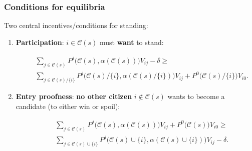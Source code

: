 \documentclass[11pt,aspectratio=169]{beamer}
\begin{document}
\begin{frame}
\frametitle{Conditions for equilibria}





Two central incentives/conditions for standing:

\pause 


\begin{enumerate}
\item \textbf{Participation}: $i \in \mathcal{C}(s)$ must \textbf{want} to stand: \begin{footnotesize}\begin{eqnarray*}
&& \sum_{j \in \mathcal{C}(s)} P^j\bigg(\mathcal{C}(s), \alpha(\mathcal{C}(s))\bigg)V_{ij} -\delta \geq \\ 
&& \sum_{j \in \mathcal{C}(s)/\{i\}} P^j\bigg(\mathcal{C}(s)/\{i\}, \alpha(\mathcal{C}(s)/\{i\})\bigg)V_{ij} + P^0\bigg(\mathcal{C}(s)/\{i\}\bigg)V_{i0}.
\end{eqnarray*} \end{footnotesize}

\pause 
\item \textbf{Entry proofness}: \textbf{no other citizen} $i\not\in\mathcal{C}(s)$ wants to become a candidate (to either win or spoil): \begin{footnotesize}\begin{eqnarray*}
&& \sum_{j \in \mathcal{C}(s)} P^j\bigg(\mathcal{C}(s), \alpha(\mathcal{C}(s))\bigg)V_{ij} + P^0\bigg(\mathcal{C}(s)\bigg)V_{i0} \geq \\
&& \sum_{j \in \mathcal{C}(s)\cup\{i\}} P^j\bigg(\mathcal{C}(s)\cup\{i\}, \alpha(\mathcal{C}(s)\cup\{i\})\bigg)V_{ij} - \delta.
\end{eqnarray*} \end{footnotesize}
\end{enumerate}

\end{frame}
\end{document}

